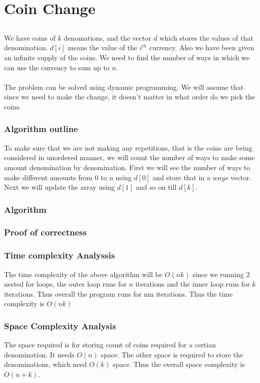 \documentclass{article}
\begin{document}
\section{Coin Change}

\subsection{}
We have coins of $k$ denomations, and the vector $d$ which stores the values of that denomination. $d[i]$ means the value of the $i^{th}$ currency. Also we have been given an infinite supply of the coins. We need to find the number of ways in which we can use the currency to sum up to $n$.
\\\\
The problem can be solved using dynamic programming. We will assume that since we need to make the change, it doesn't matter in what order do we pick the coins.

\subsubsection{Algorithm outline}
To make sure that we are not making any repetitions, that is the coins are being considered in unordered manner, we will count the number of ways to make some amount denomination by denomination. First we will see the number of ways to make different amounts from 0 to n using $d[0]$ and store that in a $ways$ vector. Next we will update the array using $d[1]$ and so on till $d[k]$.

\subsubsection{Algorithm}


\subsubsection{Proof of correctness}
\subsubsection{Time complexity Analyssis}
The time complexity of the above algorithm will be $O(nk)$ since we running 2 nested for loops, the outer loop runs for $n$ iterations and the inner loop runs for $k$  iterations. Thus overall the program runs for nm iterations. Thus the time complexity is $O(nk)$
\subsubsection{Space Complexity Analysis}
The space required is for storing count of coins required for a certian denomination. It needs $O(n)$ space. The other space is required to store the denominations, which need $O(k)$ space. Thus the overall space complexity is $O(n+k)$.
\end{document}
